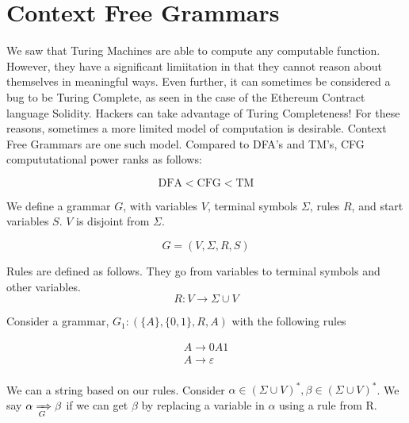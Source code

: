 \usetikzlibrary{automata, positioning, arrows}

\chapter{Context Free Grammars}

We saw that Turing Machines are able to compute any computable function. However, they have a significant limiitation in that they cannot reason about themselves in meaningful ways. Even further, it can sometimes be considered a bug to be Turing Complete, as seen in the case of the Ethereum Contract language Solidity. Hackers can take advantage of Turing Completeness! For these reasons, sometimes a more limited model of computation is desirable. Context Free Grammars are one such model. Compared to DFA's and TM's, CFG compututational power ranks as follows:

\[
    \text{DFA}  < \text{CFG} < \text{TM}
\]

\begin{definition}
    
    We define a grammar $G$, with variables $V$, terminal symbols $\Sigma$, rules $R$, and start variables $S$. $V$ is disjoint from $\Sigma$.

    \[
        G = (V, \Sigma, R, S) 
    \]

    Rules are defined as follows. They go from variables to terminal symbols and other variables.
    \[
        R: V \rightarrow \Sigma \cup V
    \] 
\end{definition}

Consider a grammar, $G_1: (\{A\}, \{0, 1\}, R, A)$ with the following rules

\begin{gather*}
    A \rightarrow 0A1 \\
    A \rightarrow \varepsilon \\
\end{gather*}

We can  a string based on our rules. Consider $\alpha \in (\Sigma \cup V)^*, \beta \in (\Sigma \cup V)^*$. We say $\alpha \xRightarrow[G]{} \beta$ if we can get $\beta$ by replacing a variable in $\alpha$ using a rule from R.

